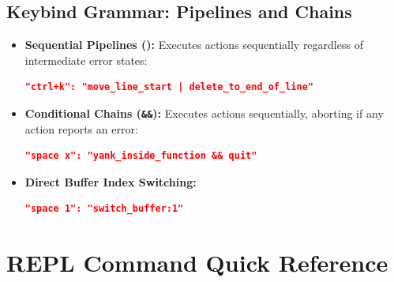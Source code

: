 \documentclass[11pt,a4paper,openany]{book}
\newcommand{\code}[1]{\colorbox{inlinebg}{\texttt{#1}}}
\begin{document}
\section{Keybind Grammar: Pipelines and Chains}
\begin{itemize}
    \item \textbf{Sequential Pipelines (\code{\textbar{}}):} Executes actions sequentially regardless of intermediate error states:
    \begin{lstlisting}[language=json]
    "ctrl+k": "move_line_start | delete_to_end_of_line"
    \end{lstlisting}
    \item \textbf{Conditional Chains (\code{\&\&}):} Executes actions sequentially, aborting if any action reports an error:
    \begin{lstlisting}[language=json]
    "space x": "yank_inside_function && quit"
    \end{lstlisting}
    \item \textbf{Direct Buffer Index Switching:}
    \begin{lstlisting}[language=json]
    "space 1": "switch_buffer:1"
    \end{lstlisting}
\end{itemize}

\appendix
\chapter{REPL Command Quick Reference}
\end{document}
